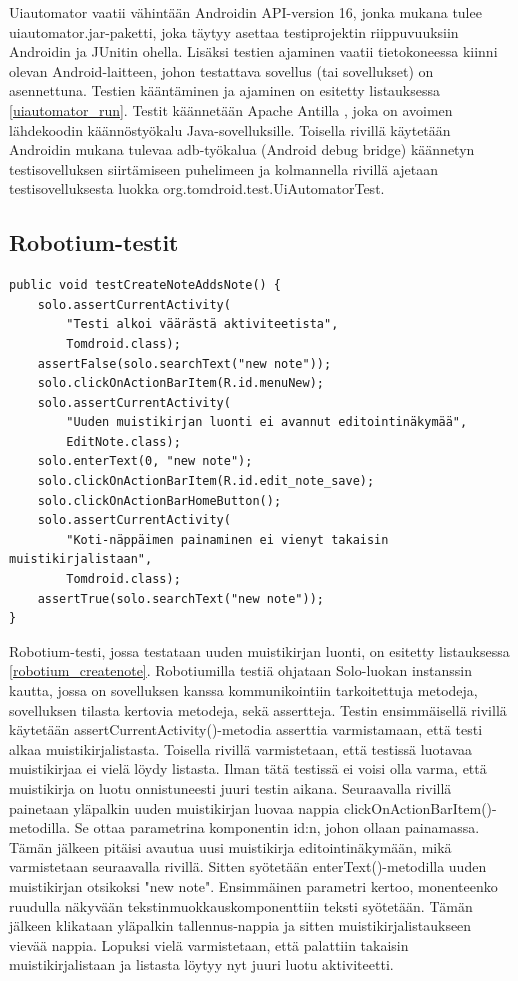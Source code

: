 Uiautomator vaatii vähintään Androidin API-version 16, jonka mukana tulee uiautomator.jar-paketti, joka täytyy asettaa testiprojektin riippuvuuksiin Androidin ja JUnitin ohella. Lisäksi testien ajaminen vaatii tietokoneessa kiinni olevan Android-laitteen, johon testattava sovellus (tai sovellukset) on asennettuna. Testien kääntäminen ja ajaminen on esitetty listauksessa \ref{uiautomator_run}. Testit käännetään Apache Antilla \cite{ant}, joka on avoimen lähdekoodin käännöstyökalu Java-sovelluksille. Toisella rivillä käytetään Androidin mukana tulevaa adb-työkalua (Android debug bridge) käännetyn testisovelluksen siirtämiseen puhelimeen ja kolmannella rivillä ajetaan testisovelluksesta luokka org.tomdroid.test.UiAutomatorTest.

\subsection{Robotium-testit}

\begin{lstlisting}[float,label=robotium_createnote,caption=Muistikirjan luontitesti Robotiumilla]
public void testCreateNoteAddsNote() {
	solo.assertCurrentActivity(
	    "Testi alkoi väärästä aktiviteetista", 
	    Tomdroid.class);
	assertFalse(solo.searchText("new note"));
	solo.clickOnActionBarItem(R.id.menuNew);
	solo.assertCurrentActivity(
	    "Uuden muistikirjan luonti ei avannut editointinäkymää", 
	    EditNote.class);
	solo.enterText(0, "new note");
	solo.clickOnActionBarItem(R.id.edit_note_save);
	solo.clickOnActionBarHomeButton();
	solo.assertCurrentActivity(
	    "Koti-näppäimen painaminen ei vienyt takaisin muistikirjalistaan", 
	    Tomdroid.class);
	assertTrue(solo.searchText("new note"));
}
\end{lstlisting}

Robotium-testi, jossa testataan uuden muistikirjan luonti, on esitetty listauksessa \ref{robotium_createnote}. Robotiumilla testiä ohjataan Solo-luokan instanssin kautta, jossa on sovelluksen kanssa kommunikointiin tarkoitettuja metodeja, sovelluksen tilasta kertovia metodeja, sekä assertteja. Testin ensimmäisellä rivillä käytetään assertCurrentActivity()-metodia asserttia varmistamaan, että testi alkaa muistikirjalistasta. Toisella rivillä varmistetaan, että testissä luotavaa muistikirjaa ei vielä löydy listasta. Ilman tätä testissä ei voisi olla varma, että muistikirja on luotu onnistuneesti juuri testin aikana. Seuraavalla rivillä painetaan yläpalkin uuden muistikirjan luovaa nappia clickOnActionBarItem()-metodilla. Se ottaa parametrina komponentin id:n, johon ollaan painamassa. Tämän jälkeen pitäisi avautua uusi muistikirja editointinäkymään, mikä varmistetaan seuraavalla rivillä. Sitten syötetään enterText()-metodilla uuden muistikirjan otsikoksi "new note". Ensimmäinen parametri kertoo, monenteenko ruudulla näkyvään tekstinmuokkauskomponenttiin teksti syötetään. Tämän jälkeen klikataan yläpalkin tallennus-nappia ja sitten muistikirjalistaukseen vievää nappia. Lopuksi vielä varmistetaan, että palattiin takaisin muistikirjalistaan ja listasta löytyy nyt juuri luotu aktiviteetti.

